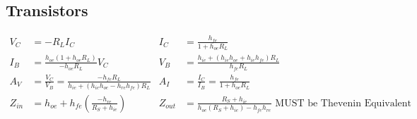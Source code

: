 	\subsection*{Transistors}
		\begin{align*}
			V_{C} &= -R_{L}I_{C} & I_{C} &= \frac{h_{fe}}{1+h_{oe}R_{L}} \\
			I_{B} &= \frac{h_{oe}\left( 1 + h_{oe}R_{L} \right)}{-h_{oe}R_{L}} V_{C} & V_{B} &= \frac{h_{ie}+\left( h_{ie}h_{oe} + h_{ie}h_{fe} \right)R_{L}}{h_{fe}R_{L}} \\ 
			A_{V} &= \frac{V_{C}}{V_{B}} = \frac{-h_{fe}R_{L}}{h_{ie}+\left(h_{ie}h_{oe} - h_{re}h_{fe} \right) R_{L}} & A_{I} &= \frac{I_{C}}{I_{B}} = \frac{h_{fe}}{1+h_{oe}R_{L}} \\
			Z_{in} &= h_{oe}+h_{fe}\left( \frac{-h_{re}}{R_{S}+h_{ie}} \right) & Z_{out} &= \frac{R_{S}+h_{ie}}{h_{oe} \left( R_{S} + h_{ie} \right) - h_{fe}h_{re}} \text{ MUST be Thevenin Equivalent} \\
		\end{align*}